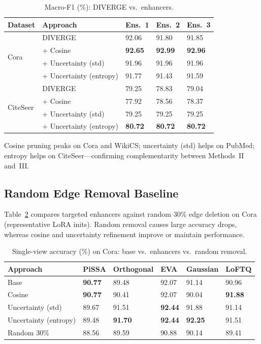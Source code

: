 \documentclass{article}
\begin{document}
\begin{table}[htbp]
\centering
\caption{Macro-F1 (\%): DIVERGE vs.\ enhancers.}
\label{tab:macro_f1_ensemble_after_enhancers}
\small
\begin{tabularx}{\textwidth}{l l *{3}{X}}
\toprule
Dataset & Approach & Ens.\ 1 & Ens.\ 2 & Ens.\ 3 \\
\midrule
\multirow{4}{*}{Cora}
 & DIVERGE & 92.06 & 91.80 & 91.85 \\
 & + Cosine & \textbf{92.65} & \textbf{92.99} & \textbf{92.96} \\
 & + Uncertainty (std) & 91.96 & 91.96 & 91.96 \\
 & + Uncertainty (entropy) & 91.77 & 91.43 & 91.59 \\
\midrule
\multirow{4}{*}{CiteSeer}
 & DIVERGE & 79.25 & 78.83 & 79.04 \\
 & + Cosine & 77.92 & 78.56 & 78.37 \\
 & + Uncertainty (std) & 79.25 & 79.25 & 79.25 \\
 & + Uncertainty (entropy) & \textbf{80.72} & \textbf{80.72} & \textbf{80.72} \\
\bottomrule
\end{tabularx}
\end{table}

Cosine pruning peaks on Cora and WikiCS; uncertainty (std) helps on PubMed; entropy
helps on CiteSeer---confirming complementarity between Methods~II and~III.


\subsection{Random Edge Removal Baseline}
Table~\ref{tab:compare_structural_enhancer_random_model} compares targeted enhancers
against random 30\% edge deletion on Cora (representative LoRA inits). Random removal
causes large accuracy drops, whereas cosine and uncertainty refinement improve or
maintain performance.

\begin{table}[htbp]
\centering
\caption{Single-view accuracy (\%) on Cora: base vs.\ enhancers vs.\ random removal.}
\label{tab:compare_structural_enhancer_random_model}
\small
\begin{tabularx}{\textwidth}{l *{5}{X}}
\toprule
Approach & PiSSA & Orthogonal & EVA & Gaussian & LoFTQ \\
\midrule
Base & \textbf{90.77} & 89.48 & 92.07 & 91.14 & 90.96 \\
Cosine & \textbf{90.77} & 90.41 & 92.07 & 90.04 & \textbf{91.88} \\
Uncertainty (std) & 89.67 & 91.51 & \textbf{92.44} & 91.88 & 91.14 \\
Uncertainty (entropy) & 89.48 & \textbf{91.70} & \textbf{92.44} & \textbf{92.25} & 91.51 \\
Random 30\% & 88.56 & 89.59 & 90.88 & 90.14 & 89.41 \\
\bottomrule
\end{tabularx}
\end{table}
\end{document}
